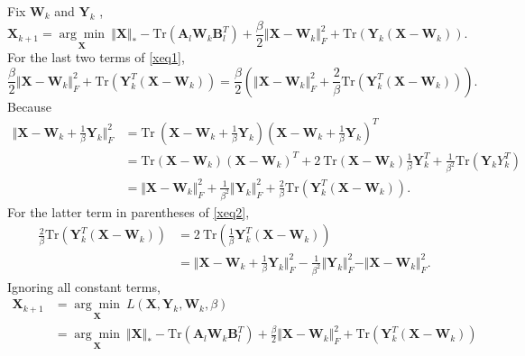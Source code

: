 \documentclass{article}
\begin{document}
{Fix $\mathbf W_k$ and $\mathbf Y_k$ ,
\begin{equation}
    \mathbf X_{k+1} =  \underset{\mathbf X}{\arg\min} \ \Vert\mathbf X \Vert_* - \text{Tr}(\mathbf A_l \mathbf W_k\mathbf B_l^T)    + \frac{\beta}{2}\Vert\mathbf X-\mathbf W_k \Vert_F^2 + \text{Tr}(\mathbf Y_k(\mathbf X-\mathbf W_k)).
    \label{xeq1}
\end{equation}
For the last two terms of \eqref{xeq1},
\begin{equation}
\frac{\beta}{2}\Vert\mathbf X-\mathbf W_k \Vert_F^2 + \text{Tr}(\mathbf Y_k^T(\mathbf X-\mathbf W_k))=  \frac{\beta}{2}\left( \Vert\mathbf X-\mathbf W_k \Vert_F^2 + \frac{2}{\beta} \text{Tr}(\mathbf Y_k^T(\mathbf X-\mathbf W_k)) \right).
\label{xeq2}
\end{equation}
Because
\begin{equation*}
    \begin{aligned}
        \Vert\mathbf X-\mathbf W_k+\frac{1}{\beta}\mathbf Y_k \Vert_F^2 & = \text{Tr} \ (\mathbf X-\mathbf W_k+\frac{1}{\beta}\mathbf Y_k)(\mathbf X-\mathbf W_k+\frac{1}{\beta}\mathbf Y_k)^T \\
        & = \text{Tr}(\mathbf X-\mathbf W_k)(\mathbf X-\mathbf W_k)^T + 2\ \text{Tr}(\mathbf X-\mathbf W_k)\frac{1}{\beta}\mathbf Y_k^T + \frac{1}{\beta^2}\text{Tr} (\mathbf Y_k Y_k^T) \\
        & = \Vert\mathbf X-\mathbf W_k \Vert_F^2 + \frac{1}{\beta^2}\Vert\mathbf Y_k \Vert_F^2 + \frac{2}{\beta}\text{Tr}(\mathbf Y_k^T(\mathbf X-\mathbf W_k)).
    \end{aligned}
\end{equation*}
For the latter term in parentheses of \eqref{xeq2},
\begin{equation}
    \begin{aligned}
\frac{2}{\beta} \text{Tr}(\mathbf Y_k^T(\mathbf X-\mathbf W_k)) & =  2 \ \text{Tr}(\frac{1}{\beta}\mathbf Y_k^T(\mathbf X-\mathbf W_k)) \\
    & = \Vert\mathbf X-\mathbf W_k+\frac{1}{\beta}\mathbf Y_k \Vert_F^2 - \frac{1}{\beta^2}\Vert\mathbf Y_k \Vert_F^2 - \Vert\mathbf X-\mathbf W_k \Vert_F^2.
\end{aligned}
\end{equation}
Ignoring all constant terms, 
\begin{equation}
\begin{aligned}
    \mathbf X_{k+1} & =\underset{\mathbf X}{\arg\min}\ L(\mathbf X,\mathbf Y_k, \mathbf W_k,\beta) \\
    & =  \underset{\mathbf X}{\arg\min} \ \Vert\mathbf X \Vert_* - \text{Tr}(\mathbf A_l\mathbf W_k\mathbf B_l^T)    + \frac{\beta}{2}\Vert\mathbf X-\mathbf W_k \Vert_F^2 + \text{Tr}(\mathbf Y_k^T(\mathbf X-\mathbf W_k)) \\

\end{aligned}
\end{equation}}
\end{document}
